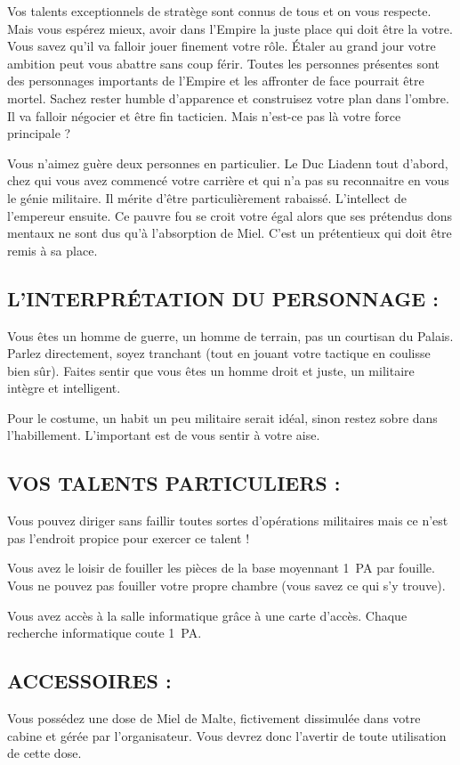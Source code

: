 \documentclass[14pt,twocolumn]{extarticle}
\begin{document}
Vos talents exceptionnels de stratège sont connus de tous et on vous respecte.
Mais vous espérez mieux, avoir dans l'Empire la juste place qui doit être la
votre. Vous savez qu'il va falloir jouer finement votre rôle. Étaler au grand
jour votre ambition peut vous abattre sans coup férir. Toutes les personnes
présentes sont des personnages importants de l'Empire et les affronter de face
pourrait être mortel. Sachez rester humble d'apparence et construisez votre
plan dans l'ombre. Il va falloir négocier et être fin tacticien. Mais n'est-ce
pas là votre force principale ?

Vous n'aimez guère deux personnes en particulier. Le Duc Liadenn tout d'abord,
chez qui vous avez commencé votre carrière et qui n'a pas su reconnaitre en
vous le génie militaire. Il mérite d'être particulièrement rabaissé.
L'intellect de l'empereur ensuite. Ce pauvre fou se croit votre égal alors que
ses prétendus dons mentaux ne sont dus qu'à l'absorption de Miel. C'est un
prétentieux qui doit être remis à sa place.

\subsection{L'INTERPRÉTATION DU PERSONNAGE :}

Vous êtes un homme de guerre, un homme de terrain, pas un courtisan du Palais.
Parlez directement, soyez tranchant (tout en jouant votre tactique en coulisse
bien sûr). Faites sentir que vous êtes un homme droit et juste, un militaire
intègre et intelligent.

Pour le costume, un habit un peu militaire serait idéal, sinon restez sobre
dans l'habillement. L'important est de vous sentir à votre aise.

\subsection{VOS TALENTS PARTICULIERS :}

Vous pouvez diriger sans faillir toutes sortes d'opérations militaires mais ce
n'est pas l'endroit propice pour exercer ce talent !

Vous avez le loisir de fouiller les pièces de la base moyennant 1~PA par
fouille. Vous ne pouvez pas fouiller votre propre chambre (vous savez ce qui
s'y trouve).

Vous avez accès à la salle informatique grâce à une carte d'accès. Chaque
recherche informatique coute 1~PA.

\subsection{ACCESSOIRES :}

Vous possédez une dose de Miel de Malte, fictivement dissimulée dans votre
cabine et gérée par l'organisateur. Vous devrez donc l'avertir de toute
utilisation de cette dose.
\end{document}
